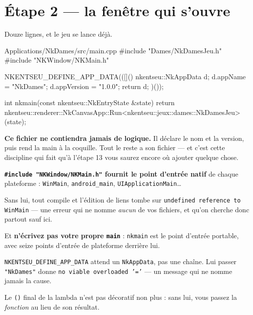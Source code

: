 \section{Étape 2 --- la fenêtre qui s'ouvre}

Douze lignes, et le jeu se lance déjà.

\begin{nkcode}{Applications/NkDames/src/main.cpp}
#include "Dames/NkDamesJeu.h"
#include "NKWindow/NKMain.h"

NKENTSEU_DEFINE_APP_DATA(([]() {
    nkentseu::NkAppData d{};
    d.appName    = "NkDames";
    d.appVersion = "1.0.0";
    return d;
})());

int nkmain(const nkentseu::NkEntryState &state) {
    return nkentseu::renderer::NkCanvasApp::Run<nkentseu::jeux::dames::NkDamesJeu>(state);
}
\end{nkcode}

\begin{nkretenir}
\textbf{Ce fichier ne contiendra jamais de logique.} Il déclare le nom et la
version, puis rend la main à la coquille. Tout le reste a son fichier --- et
c'est cette discipline qui fait qu'à l'étape 13 vous saurez encore où ajouter
quelque chose.
\end{nkretenir}

\begin{nkpiege}
\textbf{\texttt{\#include "NKWindow/NKMain.h"} fournit le point d'entrée natif}
de chaque plateforme : \texttt{WinMain}, \texttt{android\_main},
\texttt{UIApplicationMain}\dots

Sans lui, tout compile et l'édition de liens tombe sur
\texttt{undefined reference to WinMain} --- une erreur qui ne nomme
\emph{aucun} de vos fichiers, et qu'on cherche donc partout sauf ici.

Et \textbf{n'écrivez pas votre propre \texttt{main}} : \texttt{nkmain} est le
point d'entrée portable, avec seize points d'entrée de plateforme derrière lui.
\end{nkpiege}

\begin{nkpiege}
\texttt{NKENTSEU\_DEFINE\_APP\_DATA} attend un \texttt{NkAppData}, pas une
chaîne. Lui passer \texttt{"NkDames"} donne
\texttt{no viable overloaded '='} --- un message qui ne nomme jamais la cause.

Le \texttt{()} final de la lambda n'est pas décoratif non plus : sans lui, vous
passez la \emph{fonction} au lieu de son résultat.
\end{nkpiege}

